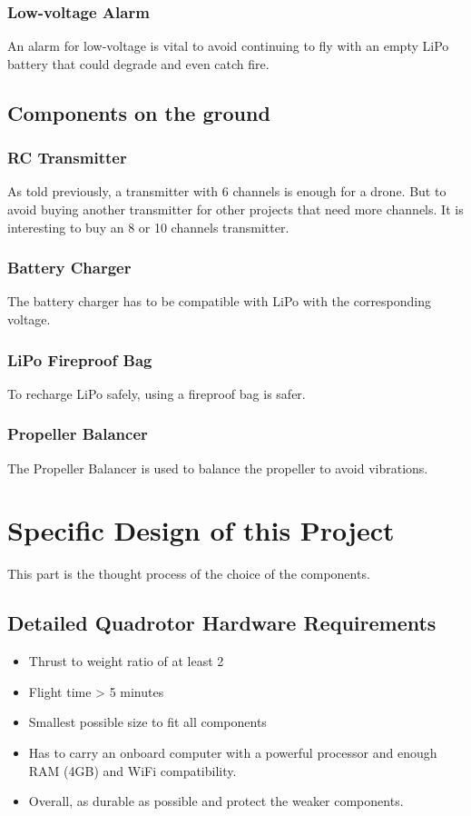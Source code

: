 \subsubsection{Low-voltage Alarm}
An alarm for low-voltage is vital to avoid continuing to fly with an empty LiPo battery that could degrade and even catch fire.

\subsection{Components on the ground}

\subsubsection{RC Transmitter}
As told previously, a transmitter with 6 channels is enough for a drone. But to avoid buying another transmitter for other projects that need more channels. It is interesting to buy an 8 or 10 channels transmitter.

\subsubsection{Battery Charger}
The battery charger has to be compatible with LiPo with the corresponding voltage.

\subsubsection{LiPo Fireproof Bag}
To recharge LiPo safely, using a fireproof bag is safer.

\subsubsection{Propeller Balancer}
The Propeller Balancer is used to balance the propeller to avoid vibrations.


\section{Specific Design of this Project}

This part is the thought process of the choice of the components.

\subsection{Detailed Quadrotor Hardware Requirements}
\begin{itemize}
    \item Thrust to weight ratio of at least 2
    \item Flight time > 5 minutes
    \item Smallest possible size to fit all components
    \item Has to carry an onboard computer with a powerful processor and enough RAM (4GB) and WiFi compatibility.
    \item Overall, as durable as possible and protect the weaker components.
\end{itemize}

